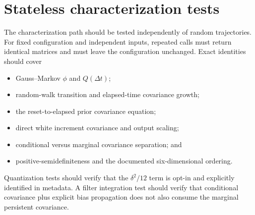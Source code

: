 \documentclass[11pt,oneside,headings=big]{scrreprt}
\begin{document}
    \section{Stateless characterization tests}
    The characterization path should be tested independently of random trajectories.
    For fixed configuration and independent inputs, repeated calls must return
    identical matrices and must leave the configuration unchanged. Exact identities
    should cover
    \begin{itemize}
        \item Gauss--Markov \(\phi\) and \(Q(\Delta t)\);
        \item random-walk transition and elapsed-time covariance growth;
        \item the reset-to-elapsed prior covariance equation;
        \item direct white increment covariance and output scaling;
        \item conditional versus marginal covariance separation; and
        \item positive-semidefiniteness and the documented six-dimensional ordering.
    \end{itemize}
    Quantization tests should verify that the \(\delta^2/12\) term is opt-in and
    explicitly identified in metadata. A filter integration test should verify that
    conditional covariance plus explicit bias propagation does not also consume the
    marginal persistent covariance.
\end{document}
